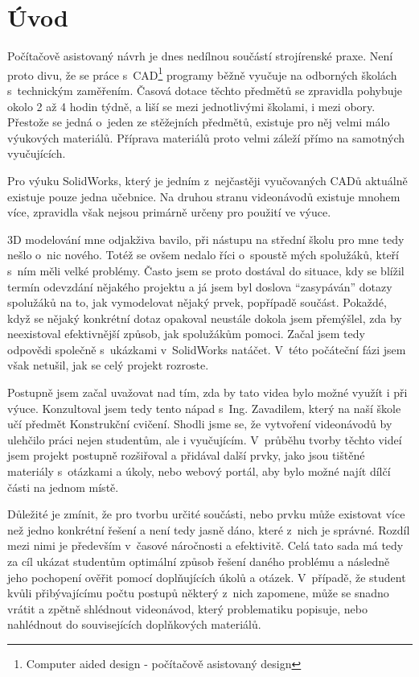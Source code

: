 \chapter*{Úvod}
Počítačově asistovaný návrh je dnes nedílnou součástí strojírenské praxe.
Není proto divu, že se práce s~CAD\footnote{Computer aided design - počítačově asistovaný design} programy běžně vyučuje na odborných školách s~technickým zaměřením.
Časová dotace těchto předmětů se zpravidla pohybuje okolo 2 až 4 hodin týdně, a liší se mezi jednotlivými školami, i mezi obory.
Přestože se jedná o~jeden ze stěžejních předmětů, existuje pro něj velmi málo výukových materiálů.
Příprava materiálů proto velmi záleží přímo na samotných vyučujících.

Pro výuku SolidWorks, který je jedním z~nejčastěji vyučovaných CADů aktuálně existuje pouze jedna učebnice.
Na druhou stranu videonávodů existuje mnohem více, zpravidla však nejsou primárně určeny pro použití ve výuce.

3D modelování mne odjakživa bavilo, při nástupu na střední školu pro mne tedy nešlo o~nic nového.
Totéž se ovšem nedalo říci o~spoustě mých spolužáků, kteří s~ním měli velké problémy.
Často jsem se proto dostával do situace, kdy se blížil termín odevzdání nějakého projektu a já jsem byl doslova \enquote{zasypáván} dotazy spolužáků na to, jak vymodelovat nějaký prvek, popřípadě součást.
Pokaždé, když se nějaký konkrétní dotaz opakoval neustále dokola jsem přemýšlel, zda by neexistoval efektivnější způsob, jak spolužákům pomoci.
Začal jsem tedy odpovědi společně s~ukázkami v~SolidWorks natáčet.
V~této počáteční fázi jsem však netušil, jak se celý projekt rozroste.

Postupně jsem začal uvažovat nad tím, zda by tato videa bylo možné využít i při výuce.
Konzultoval jsem tedy tento nápad s~Ing. Zavadilem, který na naší škole učí předmět Konstrukční cvičení.
Shodli jsme se, že vytvoření videonávodů by ulehčilo práci nejen studentům, ale i vyučujícím.
V~průběhu tvorby těchto videí jsem projekt postupně rozšiřoval a přidával další prvky, jako jsou tištěné materiály s~otázkami a úkoly, nebo webový portál, aby bylo možné najít dílčí části na jednom místě.

Důležité je zmínit, že pro tvorbu určité součásti, nebo prvku může existovat více než jedno konkrétní řešení a není tedy jasně dáno, které z~nich je správné.
Rozdíl mezi nimi je především v~časové náročnosti a efektivitě.
Celá tato sada má tedy za cíl ukázat studentům optimální způsob řešení daného problému a následně jeho pochopení ověřit pomocí doplňujících úkolů a otázek.
V~případě, že student kvůli přibývajícímu počtu postupů některý z~nich zapomene, může se snadno vrátit a zpětně shlédnout videonávod, který problematiku popisuje, nebo nahlédnout do souvisejících doplňkových materiálů.

\B{\textcolor{red}{PŠ: Dopsat, že vytvářím výukovou sadu a z čeho se skládá.}}

\newpage

